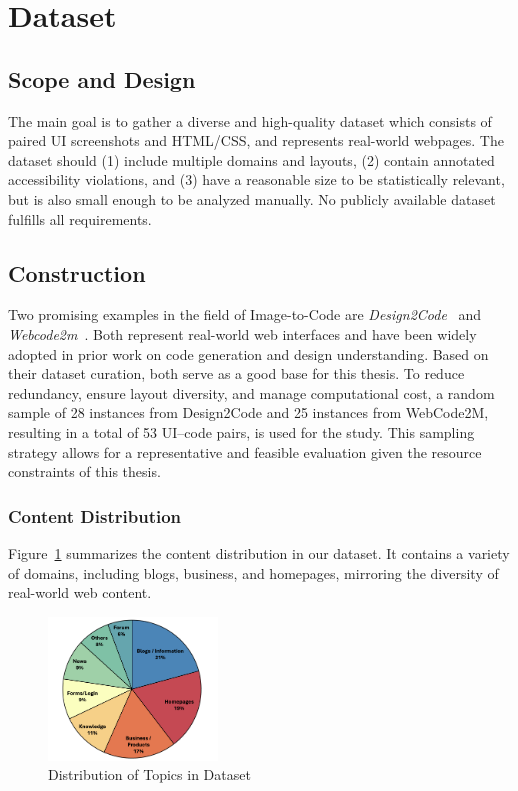 \section{Dataset}
\label{subchapter:Dataset}
\subsection{Scope and Design}
The main goal is to gather a diverse and high-quality dataset which consists of 
paired UI screenshots and HTML/CSS, and represents
real-world webpages. The dataset should (1) include multiple domains and layouts,
(2) contain annotated accessibility violations, and (3) have a reasonable size to be
statistically relevant, but is also small enough to be analyzed manually.
No publicly available dataset fulfills all requirements.

\subsection{Construction}
Two promising examples in the field of Image-to-Code are \textit{Design2Code}~\parencite{si2024design2code} 
and \textit{Webcode2m}~\parencite{gui2024webcode2m}. 
Both represent real-world web
interfaces and have been widely adopted in prior work on code generation 
and design understanding. Based on their
dataset curation, both serve as a good base for this thesis.\newline
To reduce redundancy, ensure layout diversity, and manage computational cost, a random sample of
28 instances from Design2Code and 25 instances from WebCode2M, resulting in a total of 53 UI–code
pairs, is used for the study. This sampling strategy allows for a representative and feasible evaluation
given the resource constraints of this thesis.


\subsubsection{Content Distribution}
Figure~\ref{fig:dataset_distribution} summarizes the content distribution in our dataset.
It contains a variety of domains, including blogs, business, and homepages, mirroring the 
diversity of real-world web content.

\begin{figure}[htbp]
  \centering
  \includegraphics[width=0.4\textwidth]{figures/dataset_distribution.png}
  \caption{Distribution of Topics in Dataset}
  \label{fig:dataset_distribution}
\end{figure}

